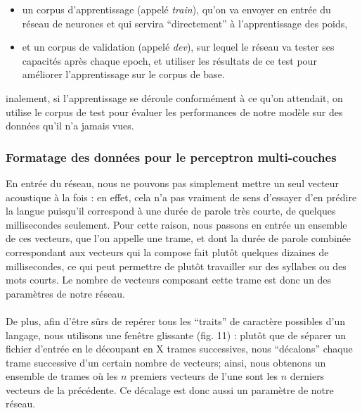 \documentclass{article}
\begin{document}
\begin{itemize}
\item un corpus d'apprentissage (appelé \textit{train}), qu'on va envoyer en entrée du réseau de neurones et qui servira ``directement'' à l'apprentissage des poids,
\item et un corpus de validation (appelé \textit{dev}), sur lequel le réseau va tester ses capacités après chaque epoch, et utiliser les résultats de ce test pour améliorer l'apprentissage sur le corpus de base.
\end{itemize}

\noindent inalement, si l'apprentissage se déroule conformément à ce qu'on attendait, on utilise le corpus de test pour évaluer les performances de notre modèle sur des données qu'il n'a jamais vues.
\newpage
\subsubsection{Formatage des données pour le perceptron multi-couches}

En entrée du réseau, nous ne pouvons pas simplement mettre un seul vecteur acoustique à la fois : en effet, cela n'a pas vraiment de sens d'essayer d'en prédire la langue puisqu'il correspond à une durée de parole très courte, de quelques millisecondes seulement. Pour cette raison, nous passons en entrée un ensemble de ces vecteurs, que l'on appelle une trame, et dont la durée de parole combinée correspondant aux vecteurs qui la compose fait plutôt quelques dizaines de millisecondes, ce qui peut permettre de plutôt travailler sur des syllabes ou des mots courts. Le nombre de vecteurs composant cette trame est donc un des paramètres de notre réseau.\\
 \\
De plus, afin d'être sûrs de repérer tous les ``traits'' de caractère possibles d'un langage, nous utilisons une fenêtre glissante (fig. 11) : plutôt que de séparer un fichier d'entrée en le découpant en X trames successives, nous ``décalons'' chaque trame successive d'un certain nombre de vecteurs; ainsi, nous obtenons un ensemble de trames où les $n$ premiers vecteurs de l'une sont les $n$ derniers vecteurs de la précédente. Ce décalage est donc aussi un paramètre de notre réseau.
\end{document}
